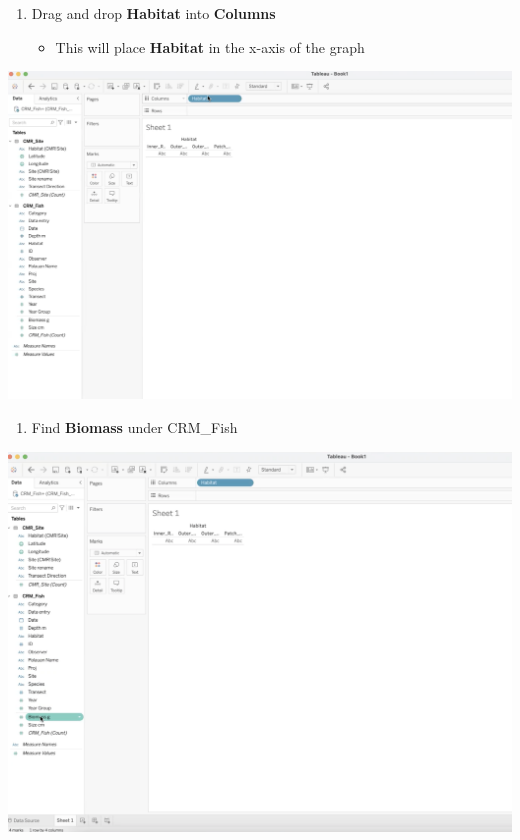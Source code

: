 \documentclass[
]{book}
\providecommand{\tightlist}{%
  \setlength{\itemsep}{0pt}\setlength{\parskip}{0pt}}
\begin{document}
\begin{enumerate}
\def\labelenumi{\arabic{enumi}.}
\setcounter{enumi}{1}
\tightlist
\item
  Drag and drop \textbf{Habitat} into \textbf{Columns}

  \begin{itemize}
  \tightlist
  \item
    This will place \textbf{Habitat} in the x-axis of the graph
  \end{itemize}
\end{enumerate}

\includegraphics{images/M3S2_drag-habitat.png}

\begin{enumerate}
\def\labelenumi{\arabic{enumi}.}
\setcounter{enumi}{2}
\tightlist
\item
  Find \textbf{Biomass} under CRM\_Fish
\end{enumerate}

\includegraphics{images/M3S2_find-biomass.png}
\end{document}
